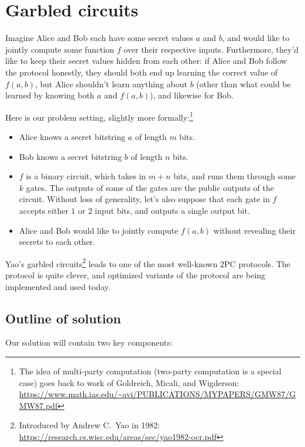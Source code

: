 \section{Garbled circuits}
\label{section-gc}
Imagine Alice and Bob each have some secret values $a$ and $b$, and
would like to jointly compute some function $f$ over their respective
inputs. Furthermore, they'd like to keep their secret values hidden
from each other: if Alice and Bob follow the protocol honestly, they
should both end up learning the correct value of $f(a,b)$, but Alice
shouldn't learn anything about $b$ (other than what could be learned
by knowing both $a$ and $f(a,b)$), and likewise for Bob.

Here is our problem setting, slightly more formally:\footnote{The idea of multi-party computation
(two-party computation is a special case)
goes back to work of Goldreich, Micali, and Wigderson: \\
 \url{https://www.math.ias.edu/~avi/PUBLICATIONS/MYPAPERS/GMW87/GMW87.pdf}}
\begin{goal}{}{}
\begin{itemize}
\item Alice knows a secret bitstring $a$ of length $m$ bits.
\item Bob knows a secret bitstring $b$ of length $n$ bits.
\item $f$ is a binary circuit, which takes in $m + n$ bits, and runs
  them through some $k$ gates. The outputs of some of the gates are
  the public outputs of the circuit. Without loss of generality, let's
  also suppose that each gate in $f$ accepts either $1$ or $2$
  input bits, and outputs a single output bit.
\item Alice and Bob would like to jointly compute $f(a,b)$ without
  revealing their secrets to each other.
\end{itemize}
\end{goal}


Yao's garbled circuits\footnote{Introduced by Andrew C.\ Yao in 1982: \\ \url{https://research.cs.wisc.edu/areas/sec/yao1982-ocr.pdf}}
leads to one of the most well-known 2PC protocols.
The protocol is quite clever,
and optimized variants of the protocol are
being implemented and used today.

\subsection{Outline of solution}
Our solution will contain two key components:

